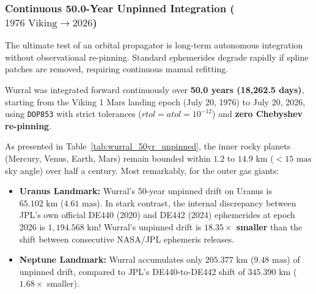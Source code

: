 \documentclass[11pt,a4paper]{article}
\begin{document}
\subsubsection{Continuous 50.0-Year Unpinned Integration (\texorpdfstring{$1976\text{ Viking} \to 2026$}{1976 Viking to 2026})}
\label{subsubsec:unpinned_50yr}

The ultimate test of an orbital propagator is long-term autonomous integration without observational re-pinning. Standard ephemerides degrade rapidly if spline patches are removed, requiring continuous manual refitting.

Wurral was integrated forward continuously over \textbf{50.0 years (18,262.5 days)}, starting from the Viking 1 Mars landing epoch (July 20, 1976) to July 20, 2026, using \texttt{DOP853} with strict tolerances ($rtol = atol = 10^{-12}$) and \textbf{zero Chebyshev re-pinning}.

As presented in Table~\ref{tab:wurral_50yr_unpinned}, the inner rocky planets (Mercury, Venus, Earth, Mars) remain bounded within $1.2$ to $14.9\text{ km}$ ($< 15\text{ mas}$ sky angle) over half a century. Most remarkably, for the outer gas giants:
\begin{itemize}
    \item \textbf{Uranus Landmark:} Wurral's 50-year unpinned drift on Uranus is \textbf{$65.102\text{ km}$} ($4.61\text{ mas}$). In stark contrast, the internal discrepancy between JPL's own official DE440 (2020) and DE442 (2024) ephemerides at epoch 2026 is \textbf{$1{,}194.568\text{ km}$}! Wurral's unpinned drift is \textbf{$18.35\times$ smaller} than the shift between consecutive NASA/JPL ephemeris releases.
    \item \textbf{Neptune Landmark:} Wurral accumulates only $205.377\text{ km}$ ($9.48\text{ mas}$) of unpinned drift, compared to JPL's DE440-to-DE442 shift of $345.390\text{ km}$ ($1.68\times$ smaller).
\end{itemize}
\end{document}
